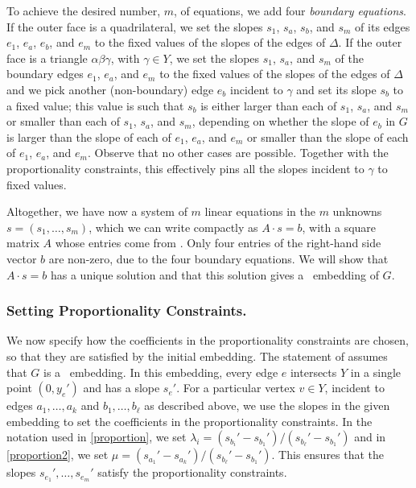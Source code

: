 To achieve the desired number, $m$, of equations, we add
four \emph{boundary equations}.  If the outer face is a quadrilateral, we set
the slopes $s_1$, $s_a$, $s_b$, and $s_m$ of its edges $e_1$, $e_a$, $e_b$, and $e_m$ to the fixed values of the slopes of the edges of $\Delta$. If the outer face is a triangle $\alpha\beta\gamma$, with $\gamma\in Y$, we set the slopes $s_1$, $s_a$, and $s_m$ of the boundary edges $e_1$, $e_a$, and $e_m$ to the fixed values of the slopes of the edges of $\Delta$ and we pick another (non-boundary) edge $e_b$ incident to $\gamma$ and set its slope $s_b$ to a fixed value; this value is such that $s_b$ is either larger than each of $s_1$, $s_a$, and $s_m$ or smaller than each of $s_1$, $s_a$, and $s_m$, depending on whether the slope of $e_b$ in $G$ is larger than the slope of each of $e_1$, $e_a$, and $e_m$ or smaller than the slope of each of $e_1$, $e_a$, and $e_m$. Observe that no other cases are possible. Together with the proportionality constraints, this effectively pins all the slopes incident to $\gamma$ to fixed values.

Altogether, we have now a system of $m$ linear equations
in the $m$ unknowns $s=(s_1,\ldots,s_m)$, which we can write
compactly as
$A\cdot s = b$, with a square matrix $A$ whose entries come from
\thetag{\ref{eq:slope0}--\ref{eq:proportion2}}.
Only four entries of
the right-hand side vector
$b$
are non-zero, due to the four boundary equations.
We will show that $A\cdot s=b$ has a unique
solution and that this solution gives a \Fary\ embedding of $G$.

\subsubsection{Setting Proportionality Constraints.}
%
%
We now specify how the coefficients in the proportionality constraints
are chosen, so that they are satisfied by the initial embedding.  The statement of  assumes that $G$ is a \Fary\ embedding.  In this embedding, every edge $e$ intersects $Y$
in a single point $(0,y_e')$ and has a slope $s_e'$.  For a particular
vertex $v\in Y$, incident to edges $a_1,\ldots,a_k$ and $b_1,\ldots,b_\ell$
as described above, we use the slopes in the given embedding to set the
coefficients in the proportionality constraints.  In the notation used
in \eqref{proportion}, we set
$\lambda_i = (s_{b_i}'-s_{b_1}')/(s_{b_\ell}'-s_{b_1}')$
and in \eqref{proportion2}, we set $\mu = (s_{a_1}'-s_{a_k}')/(s_{b_\ell}'-s_{b_1}')$. This ensures that the slopes $s_{e_1}',\ldots,s_{e_m}'$ satisfy the
proportionality constraints.


